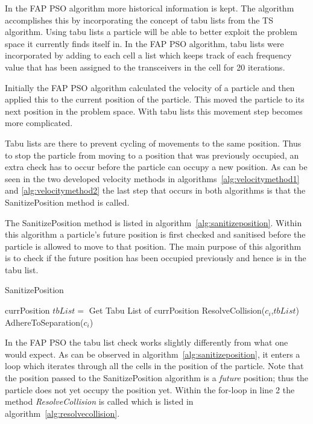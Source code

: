 In the FAP PSO algorithm more historical information is kept. The algorithm accomplishes this by incorporating the concept of tabu lists from the TS algorithm. Using tabu lists a particle will be able to better exploit the problem space it currently finds itself in. In the FAP PSO algorithm, tabu lists were incorporated by adding to each cell a list which keeps track of each frequency value that has been assigned to the transceivers in the cell for 20 iterations.

Initially the FAP PSO algorithm calculated the velocity of a particle and then applied this to the current position of the particle. This moved the particle to its next position in the problem space. With tabu lists this movement step becomes more complicated.

Tabu lists are there to prevent cycling of movements to the same position. Thus to stop the particle from moving to a position that was previously occupied, an extra check has to occur before the particle can occupy a new position. As can be seen in the two developed velocity methods in algorithms~\ref{alg:velocitymethod1} and \ref{alg:velocitymethod2} the last step that occurs in both algorithms is that the SanitizePosition method is called.


The SanitizePosition method is listed in algorithm~\ref{alg:sanitizeposition}. Within this algorithm a particle's future position is first checked and sanitised before the particle is allowed to move to that position. The main purpose of this algorithm is to check if the future position has been occupied previously and hence is in the tabu list.
\begin{algorithm}[H]
\caption{SanitizePosition}
\label{alg:sanitizeposition}
\begin{algorithmic}[1]
	\Require currPosition
		\State $tbList = $ Get Tabu List of currPosition
		\State ResolveCollision($c_i$,$tbList$)
		\State AdhereToSeparation($c_i$)
	\EndFor
\end{algorithmic}
\end{algorithm}


In the FAP PSO the tabu list check works slightly differently from what one would expect. As can be observed in algorithm~\ref{alg:sanitizeposition}, it enters a loop which iterates through all the cells in the position of the particle. Note that the position passed to the SanitizePosition algorithm is a \emph{future} position; thus the particle does not yet occupy the position yet. Within the for-loop in line 2 the method \emph{ResolveCollision} is called which is listed in algorithm~\ref{alg:resolvecollision}.

